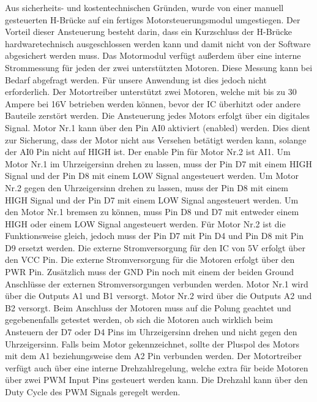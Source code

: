Aus sicherheits- und kostentechnischen Gründen, wurde von einer manuell gesteuerten H-Brücke auf ein fertiges Motorsteuerungsmodul umgestiegen. Der Vorteil dieser Ansteuerung besteht darin, dass ein Kurzschluss der H-Brücke hardwaretechnisch ausgeschlossen werden kann und damit nicht von der Software abgesichert werden muss. Das Motormodul verfügt außerdem über eine interne Strommessung für jeden der zwei unterstützten Motoren. Diese Messung kann bei Bedarf abgefragt werden. Für unsere Anwendung ist dies jedoch nicht erforderlich. Der Motortreiber unterstützt zwei Motoren, welche mit bis zu 30 Ampere bei 16V betrieben werden können, bevor der IC überhitzt oder andere Bauteile zerstört werden. Die Ansteuerung jedes Motors erfolgt über ein digitales Signal. Motor Nr.1 kann über den Pin AI0 aktiviert (enabled) werden. Dies dient zur Sicherung, dass der Motor nicht aus Versehen betätigt werden kann, solange der AI0 Pin nicht auf HIGH ist. Der enable Pin für Motor Nr.2 ist AI1. Um Motor Nr.1 im Uhrzeigersinn drehen zu lassen, muss der Pin D7 mit einem HIGH Signal und der Pin D8 mit einem LOW Signal angesteuert werden. Um Motor Nr.2 gegen den Uhrzeigersinn drehen zu lassen, muss der Pin D8 mit einem HIGH Signal und der Pin D7 mit einem LOW Signal angesteuert werden. Um den Motor Nr.1 bremsen zu können, muss Pin D8 und D7 mit entweder einem HIGH oder einem LOW Signal angesteuert werden. Für Motor Nr.2 ist die Funktionsweise gleich, jedoch muss der Pin D7 mit Pin D4 und Pin D8 mit Pin D9 ersetzt werden. Die externe Stromversorgung für den IC von 5V erfolgt über den VCC Pin. Die externe Stromversorgung für die Motoren erfolgt über den PWR Pin. Zusätzlich muss der GND Pin noch mit einem der beiden Ground Anschlüsse der externen Stromversorgungen verbunden werden. Motor Nr.1 wird über die Outputs A1 und B1 versorgt. Motor Nr.2 wird über die Outputs A2 und B2 versorgt. Beim Anschluss der Motoren muss auf die Polung geachtet und gegebenenfalls getestet werden, ob sich die Motoren auch wirklich beim Ansteuern der D7 oder D4 Pins im Uhrzeigersinn drehen und nicht gegen den Uhrzeigersinn. Falls beim Motor gekennzeichnet, sollte der Pluspol des Motors mit dem A1 beziehungsweise dem A2 Pin verbunden werden. Der Motortreiber verfügt auch über eine interne Drehzahlregelung, welche extra für beide Motoren über zwei \ac{PWM} Input Pins gesteuert werden kann. Die Drehzahl kann über den Duty Cycle des \ac{PWM} Signals geregelt werden.
